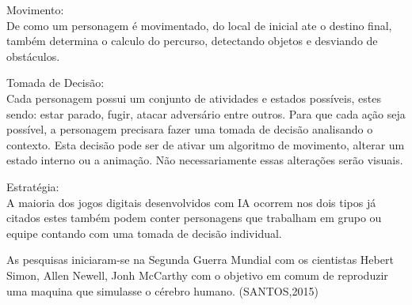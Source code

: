 \begin{alineascomponto}
	
   \item Movimento:\\
   De como um personagem é movimentado, do local de inicial ate o destino final, também determina o calculo do percurso, detectando objetos e desviando de obstáculos.
   
 \item Tomada de Decisão:\\
Cada personagem possui um conjunto de atividades e estados possíveis, estes sendo: estar parado, fugir, atacar adversário entre outros. Para que cada ação seja possível, a personagem precisara fazer uma tomada de decisão analisando o contexto. Esta decisão pode ser de ativar um algoritmo de movimento, alterar um estado interno ou a animação. Não necessariamente essas alterações serão visuais.

\item Estratégia:\\
A maioria dos jogos digitais desenvolvidos com IA ocorrem nos dois tipos já citados estes também podem conter personagens que trabalham em grupo ou equipe contando com uma tomada de decisão individual.

	\end{alineascomponto}

	
As pesquisas iniciaram-se na Segunda Guerra Mundial com os cientistas Hebert Simon, Allen Newell,  Jonh McCarthy com o objetivo em comum de reproduzir uma maquina que simulasse o cérebro humano. (SANTOS,2015) 
	
	
	
	
	
